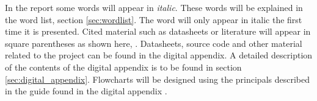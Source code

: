 \documentclass[../main.tex]{subfiles}
\begin{document}
In the report some words will appear in \textit{italic}. These words will be explained in the word list, section \ref{sec:wordlist}. The word will only appear in italic the first time it is presented. Cited material such as datasheets or literature will appear in square parentheses as shown here, \cite{christoffersloth}. Datasheets, source code and other material related to the project can be found in the digital appendix. A detailed description of the contents of the digital appendix is to be found in section \ref{sec:digital_appendix}. Flowcharts will be designed using the principals described in the guide found in the digital appendix \cite{Flowchart_Symbols}.
\end{document}
